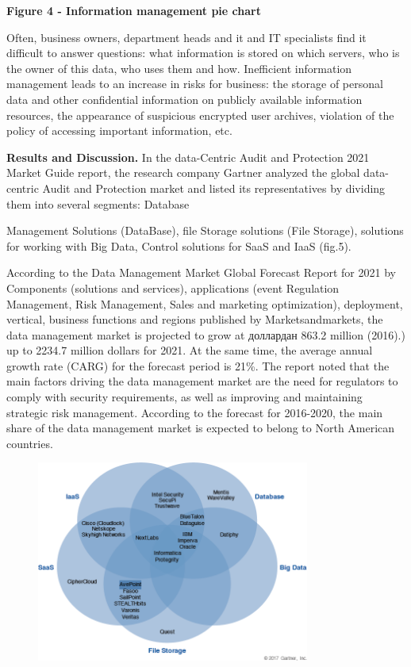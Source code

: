 \textbf{Figure 4 - Information management pie chart}

Often, business owners, department heads and it and IT specialists find
it difficult to answer questions: what information is stored on which
servers, who is the owner of this data, who uses them and how.
Inefficient information management leads to an increase in risks for
business: the storage of personal data and other confidential
information on publicly available information resources, the appearance
of suspicious encrypted user archives, violation of the policy of
accessing important information, etc.

\textbf{Results and Discussion.} In the data-Centric Audit and
Protection 2021 Market Guide report, the research company Gartner
analyzed the global data-centric Audit and Protection market and listed
its representatives by dividing them into several segments: Database

Management Solutions (DataBase), file Storage solutions (File Storage),
solutions for working with Big Data, Control solutions for SaaS and IaaS
(fig.5).

According to the Data Management Market Global Forecast Report for 2021
by Components (solutions and services), applications (event Regulation
Management, Risk Management, Sales and marketing optimization),
deployment, vertical, business functions and regions published by
Marketsandmarkets, the data management market is projected to grow at
доллардан 863.2 million (2016).) up to 2234.7 million dollars for 2021.
At the same time, the average annual growth rate (CARG) for the forecast
period is 21\%. The report noted that the main factors driving the data
management market are the need for regulators to comply with security
requirements, as well as improving and maintaining strategic risk
management. According to the forecast for 2016-2020, the main share of
the data management market is expected to belong to North American
countries.

\begin{figure}[H]
	\centering
	\includegraphics[width=0.8\textwidth]{assets/67}
	\caption*{}
\end{figure}

